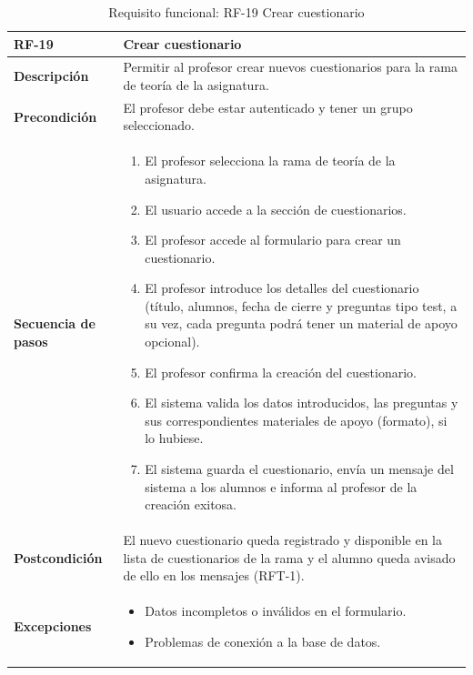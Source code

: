\begin{table}[H]
\centering
\begin{tabularx}{\textwidth}{
  |>{\centering\arraybackslash}l
  |>{\centering\arraybackslash}X|}
\hline
\textbf{RF-19} & \textbf{Crear cuestionario} \\ \hline

\textbf{Descripción} & Permitir al profesor crear nuevos cuestionarios para la rama de teoría de la asignatura. \\ \hline

\textbf{Precondición} & El profesor debe estar autenticado y tener un grupo seleccionado. \\ \hline

\textbf{Secuencia de pasos} & 
\begin{enumerate}
  \item El profesor selecciona la rama de teoría de la asignatura.
  \item El usuario accede a la sección de cuestionarios.
  \item El profesor accede al formulario para crear un cuestionario.
  \item El profesor introduce los detalles del cuestionario (título, alumnos, fecha de cierre y preguntas tipo test, a su vez, cada pregunta podrá tener un material de apoyo opcional).
  \item El profesor confirma la creación del cuestionario.
  \item El sistema valida los datos introducidos, las preguntas y sus correspondientes materiales de apoyo (formato), si lo hubiese.
  \item El sistema guarda el cuestionario, envía un mensaje del sistema a los alumnos e informa al profesor de la creación exitosa.
\end{enumerate} \\ \hline

\textbf{Postcondición} & El nuevo cuestionario queda registrado y disponible en la lista de cuestionarios de la rama y el alumno queda avisado de ello en los mensajes (RFT-1). \\ \hline

\textbf{Excepciones} & 
\begin{itemize}
  \item Datos incompletos o inválidos en el formulario.
  \item Problemas de conexión a la base de datos.
\end{itemize} \\ \hline
\end{tabularx}
\caption{Requisito funcional: RF-19 Crear cuestionario}
\label{tab:RF-19}
\end{table}

